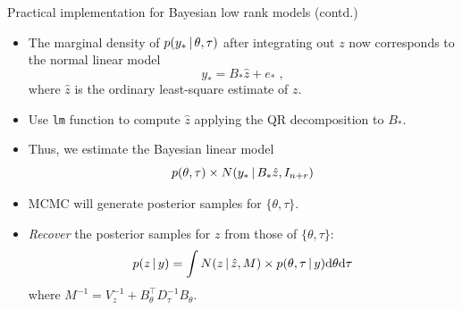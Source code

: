 \begin{frame}{Practical implementation for Bayesian low rank models (contd.)}

\begin{itemize}\setlength{\itemsep}{0.cm}
\item The marginal density of $p(y_{\ast}\,|\, \theta,\tau)$ after integrating out $z$ now corresponds to the normal linear model
\[
y_{\ast} = B_{\ast}\hat{z} + e_{\ast}\;, 
\]
where $\hat{z}$ is the ordinary least-square estimate of $z$. 

\item Use \texttt{lm} function to compute $\hat{z}$ applying the QR decomposition to $B_{\ast}$.

\item Thus, we estimate the Bayesian linear model
\[
 p(\theta,\tau) \times N(y_{\ast}\,|\, B_{\ast}\hat{z}, I_{n+r})
\]

\item MCMC will generate posterior samples for $\{\theta, \tau\}$. 

\item \emph{Recover} the posterior samples for $z$ from those of $\{\theta,\tau\}$:
\[
 p(z\,|\, y) = \int N(z\,|\, \hat{z}, M) \times p(\theta,\tau\,|\, y)\mbox{d}{\theta}\mbox{d}\tau
\]
where $M^{-1} = V_z^{-1} + B_{\theta}^{\top}D_{\tau}^{-1}B_{\theta}$.

\end{itemize}

\end{frame}



